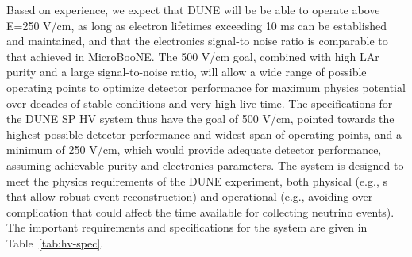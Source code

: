Based on experience, we expect that DUNE will be be able to operate  above E=250 V/cm, 
as long as electron lifetimes exceeding 10 ms can be established and maintained, %
and that the electronics signal-to noise ratio is comparable to that achieved in MicroBooNE. 
The 500 V/cm \efield goal, combined with high LAr purity and a large signal-to-noise ratio, will allow  a wide range of possible operating points to optimize detector performance for maximum physics potential over decades of stable conditions and very high live-time. 
The specifications for the DUNE SP HV system thus have the goal of 500 V/cm, pointed  towards the highest possible detector performance and widest span of operating points, and a minimum of 250 V/cm, which would provide adequate detector performance, assuming achievable purity and electronics parameters.
The  system is designed to meet the physics requirements of the DUNE experiment,  both physical  (e.g., \efield{}s that allow robust event reconstruction) and operational (e.g., avoiding over-complication that could affect %
the time available for collecting neutrino events). %
The important requirements and specifications for the  system are given in Table~\ref{tab:hv-spec}.  

%  



